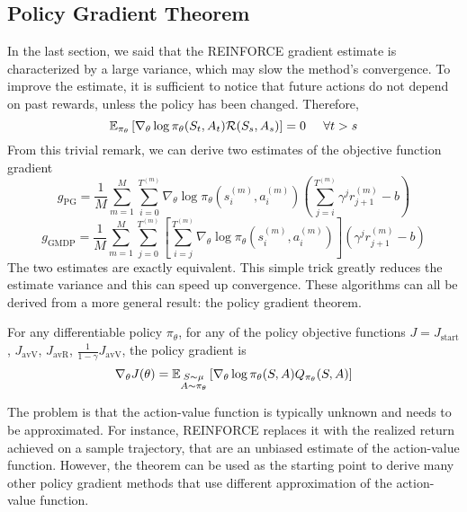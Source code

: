 \subsection{Policy Gradient Theorem}
In the last section, we said that the REINFORCE gradient estimate is
characterized by a large variance, which may slow the method's convergence. 
To improve the estimate, it is sufficient to notice that future actions do not
depend on past rewards, unless the policy has been changed. Therefore, 
\begin{equation}
	\E[\pi_\theta]{\nabla_\theta\log \pi_\theta(S_t, A_t) \calR(S_s, A_s)} = 0
	\;\;\;\;\; \forall t>s
\end{equation}
From this trivial remark, we can derive two estimates of the objective function
gradient
\begin{equation}
	g_{\text{PG}} = \frac{1}{M} \sum^{M}_{m=1} \sum_{i=0}^{T^{(m)}} 
	\nabla_\theta \log \pi_\theta(s_i^{(m)}, a_i^{(m)}) \left( 
	\sum^{T^{(m)}}_{j=i} \gamma^j r_{j+1}^{(m)} - b \right)
\end{equation}
\begin{equation}
	g_{\text{GMDP}} = \frac{1}{M} \sum^{M}_{m=1} \sum_{j=0}^{T^{(m)}} \left[ 
	\sum_{i=j}^{T^{(m)}} \nabla_\theta \log \pi_\theta(s_i^{(m)}, a_i^{(m)})
	\right] \left(\gamma^j r_{j+1}^{(m)} - b \right)  
\end{equation}
The two estimates are exactly equivalent. This simple trick greatly reduces the
estimate variance and this can speed up convergence. These algorithms can all 
be derived from a more general result: the policy gradient theorem. 
\begin{theorem}
	For any differentiable policy $\pi_\theta$, for any of the policy objective
	functions $J = J_{\text{start}}$, $J_{\text{avV}}$, $J_{\text{avR}}$,
	$\frac{1}{1-\gamma} J_{\text{avV}}$, the policy gradient is 
	\begin{equation}
		\nabla_\theta J(\theta) =
		\E[\substack{S \sim \mu\\A \sim \pi_\theta}]{\nabla_\theta\log
		\pi_\theta(S,A) Q_{\pi_\theta}(S, A)}
	\end{equation}
\end{theorem}
The problem is that the action-value function is typically unknown and needs to
be approximated. For instance, REINFORCE replaces it with the realized return
achieved on a sample trajectory, that are an unbiased estimate of the
action-value function. However, the theorem can be used as the starting point
to derive many other policy gradient methods that use different approximation
of the action-value function.

